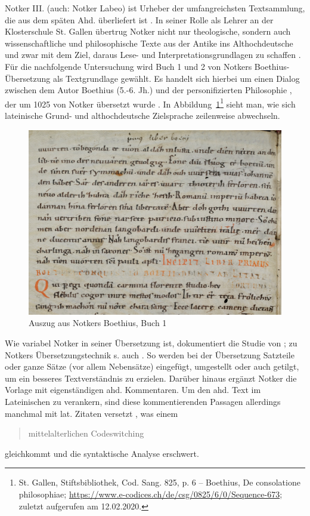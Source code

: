 Notker III. (auch: Notker Labeo) ist Urheber der umfangreichsten Textsammlung, die aus dem späten Ahd. überliefert ist \parencites[157]{Meineke2001}. In seiner Rolle als Lehrer an der Klosterschule St. Gallen übertrug Notker nicht nur theologische, sondern auch wissenschaftliche und philosophische Texte aus der Antike ins Althochdeutsche und zwar mit dem Ziel, daraus Lese- und Interpretationsgrundlagen zu schaffen \parencite[zur Übersicht s.][136]{Sonderegger2003}. Für die nachfolgende Untersuchung wird Buch 1 und 2 von Notkers Boethius-Übersetzung  als Textgrundlage gewählt. Es handelt sich hierbei um einen Dialog zwischen dem Autor Boethius (5.-6. Jh.) und der personifizierten Philosophie \parencite[vgl.][]{Gruber2006}, der um 1025 von Notker übersetzt wurde \parencite[138]{Sonderegger2003}. 
In Abbildung~\ref{abb:notker-hand}\footnote{St. Gallen, Stiftsbibliothek, Cod. Sang. 825, p. 6 – Boethius, De consolatione philosophiae; \url{https://www.e-codices.ch/de/csg/0825/6/0/Sequence-673}; zuletzt aufgerufen am 12.02.2020.} sieht man, wie sich lateinische Grund- und althochdeutsche Zielsprache zeilenweise abwechseln.   

 \begin{figure}[h]
\begin{center}
  \includegraphics[width=10 cm]{images/notker-handschrift-buch1-ausschnitt.jpg}
\caption {Auszug aus Notkers Boethius, Buch 1}
\label{abb:notker-hand}
\end{center}
\end{figure} 


Wie variabel Notker in seiner Übersetzung ist, dokumentiert die Studie von \textcite{Eilers2003}; zu Notkers Übersetzungstechnik s. auch \textcite{Glauch2003}. So werden bei der Übersetzung Satzteile oder ganze Sätze (vor allem Nebensätze) eingefügt, umgestellt oder auch getilgt, um ein besseres Textverständnis zu erzielen. Darüber hinaus ergänzt Notker die Vorlage mit eigenständigen ahd. Kommentaren. Um den ahd. Text im Lateinischen zu verankern, sind diese kommentierenden Passagen allerdings manchmal mit lat. Zitaten versetzt \parencite[vgl.][137]{Sonderegger2003}, was einem \blockcquote{Glaser2016}{mittelalterlichen Codeswitching} gleichkommt und die syntaktische Analyse erschwert.  


